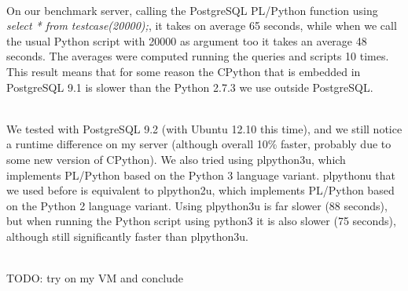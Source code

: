 ~~\\
On our benchmark server, calling the PostgreSQL PL/Python function using \textit{select * from testcase(20000);}, it takes on average 65 seconds, while when we call the usual Python script with 20000 as argument too it takes an average 48 seconds. The averages were computed running the queries and scripts 10 times. This result means that for some reason the CPython that is embedded in PostgreSQL 9.1 is slower than the Python 2.7.3 we use outside PostgreSQL.

~~\\
We tested with PostgreSQL 9.2 (with Ubuntu 12.10 this time), and we still notice a runtime difference on my server (although overall 10\% faster, probably due to some new version of CPython). We also tried using plpython3u, which implements PL/Python based on the Python 3 language variant. plpythonu that we used before is equivalent to plpython2u, which implements PL/Python based on the Python 2 language variant. Using plpython3u is far slower (88 seconds), but when running the Python script using python3 it is also slower (75 seconds), although still significantly faster than plpython3u.

~~\\
TODO: try on my VM and conclude


